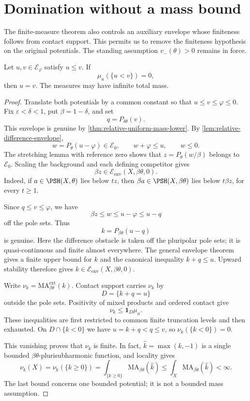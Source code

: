 \section{Domination without a mass bound}

The finite-measure theorem also controls an auxiliary envelope whose finiteness follows from contact support. This permits us to remove the finiteness hypothesis on the original potentials. The standing assumption $v_-(\theta)>0$ remains in force.

\begin{lemma}\label{lem:relative-zero-domination}
Let $u,v\in\mathcal E_\varphi$ satisfy $u\leq v$. If
\[
 \mu_u(\{u<v\})=0,
\]
then $u=v$. The measures may have infinite total mass.
\end{lemma}
\begin{proof}
Translate both potentials by a common constant so that $u\leq v\leq\varphi\leq0$. Fix $\varepsilon<\delta<1$, put $\beta=1-\delta$, and set
\[
 q=P_{\delta\theta}(v).
\]
This envelope is genuine by \cref{thm:relative-uniform-mass-lower}. By \cref{lem:relative-difference-envelope},
\[
 w=P_\theta(u-\varphi)\in\mathcal E_0,
 \qquad w+\varphi\leq u,\qquad w\leq0.
\]
The stretching lemma with reference zero shows that
$z=P_\theta(w/\beta)$ belongs to $\mathcal E_0$. Scaling the background and each defining competitor gives
\[
 \beta z\in\mathcal E_{\mathrm{env}}(X,\beta\theta,0).
\]
Indeed, if $a\in\PSH(X,\theta)$ lies below $t z$, then $\beta a\in\PSH(X,\beta\theta)$ lies below $t\beta z$, for every $t\geq1$.

Since $q\leq v\leq\varphi$, we have
\[
 \beta z\leq w\leq u-\varphi\leq u-q
\]
off the pole sets. Thus
\[
 k=P_{\beta\theta}(u-q)
\]
is genuine. Here the difference obstacle is taken off the pluripolar pole sets; it is quasi-continuous and finite almost everywhere. The general envelope theorem gives a finite upper bound for $k$ and the canonical inequality $k+q\leq u$. Upward stability therefore gives
$k\in\mathcal E_{\mathrm{env}}(X,\beta\theta,0)$.

Write $\nu_k=\mathrm{MA}^{\mathrm{ext}}_{\beta\theta}(k)$. Contact support carries $\nu_k$ by
\[
 D=\{k+q=u\}
\]
outside the pole sets. Positivity of mixed products and ordered contact give
\[
 \nu_k\leq\mathbf1_D\mu_u.
\]
These inequalities are first restricted to common finite truncation levels and then exhausted. On $D\cap\{k<0\}$ we have $u=k+q<q\leq v$, so $\nu_k(\{k<0\})=0$.

This vanishing proves that $\nu_k$ is finite. In fact, $\widehat k=\max(k,-1)$ is a single bounded $\beta\theta$-plurisubharmonic function, and locality gives
\[
 \nu_k(X)=\nu_k(\{k\geq0\})
 =\int_{\{k\geq0\}}\mathrm{MA}_{\beta\theta}(\widehat k)
 \leq\int_X\mathrm{MA}_{\beta\theta}(\widehat k)<\infty.
\]
The last bound concerns one bounded potential; it is not a bounded mass assumption.


\end{proof}
